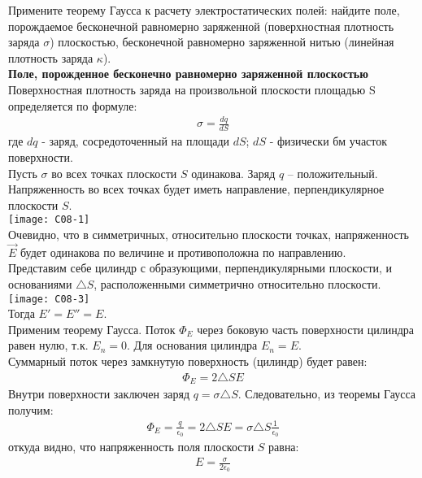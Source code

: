 \documentclass[__main__.tex]{subfiles}
\begin{document}
Примените теорему Гаусса к расчету электростатических полей: найдите поле, порождаемое бесконечной равномерно заряженной (поверхностная плотность заряда $\sigma$) плоскостью, бесконечной равномерно заряженной нитью (линейная плотность заряда $\kappa$).\\

\textbf{Поле, порожденное бесконечно равномерно заряженной плоскостью}\\
 Поверхностная плотность заряда на произвольной плоскости площадью S определяется по формуле:\\
 \begin{gather}
 \sigma = \frac{dq}{dS}
 \end{gather}
 где $dq$ - заряд, сосредоточенный на площади $dS$; $dS$ - физически бм участок поверхности.\\
 Пусть $\sigma$ во всех точках плоскости $S$ одинакова. Заряд $q$ – положительный. Напряженность во всех точках будет иметь направление, перпендикулярное плоскости $S$.\\
 \texttt{[image: C08-1]}\\
 Очевидно, что в симметричных, относительно плоскости точках, напряженность $\vec{E}$ будет одинакова по величине и противоположна по направлению. \\
 Представим себе цилиндр с образующими, перпендикулярными плоскости, и основаниями $\triangle S$, расположенными симметрично относительно плоскости.\\
 \texttt{[image: C08-3]}\\
 Тогда $E' = E'' = E$.\\
 Применим теорему Гаусса. Поток $\Phi_E$ через боковую часть поверхности цилиндра равен нулю, т.к. $E_n = 0$. Для основания цилиндра $E_n = E$.\\ 
 Суммарный поток через замкнутую поверхность (цилиндр) будет равен:\\
 \begin{gather}
 \Phi_E = 2\triangle SE
 \end{gather}
 Внутри поверхности заключен заряд $q = \sigma \triangle S$. Следовательно, из теоремы Гаусса получим: 
 \begin{gather}
 \Phi_E = \frac{q}{\epsilon_0} = 2\triangle SE = \sigma \triangle S \frac{1}{\epsilon_0}
 \end{gather}
 откуда видно, что напряженность поля плоскости $S$ равна: 
 \begin{gather}
 E = \frac{\sigma}{2\epsilon_0}
 \end{gather}
\end{document}
